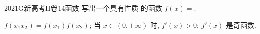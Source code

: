 
\begin{problem}{2021}{G}{新高考II卷}{14}{函数}
写出一个具有性质  的函数 $f(x)=$\underline{\hspace{4em}}.

 $f(x_1x_2)=f(x_1)f(x_2)$;  当 $x\in(0,+\infty)$ 时, $f'(x)>0$;  $f'(x)$ 是奇函数.
\end{problem}